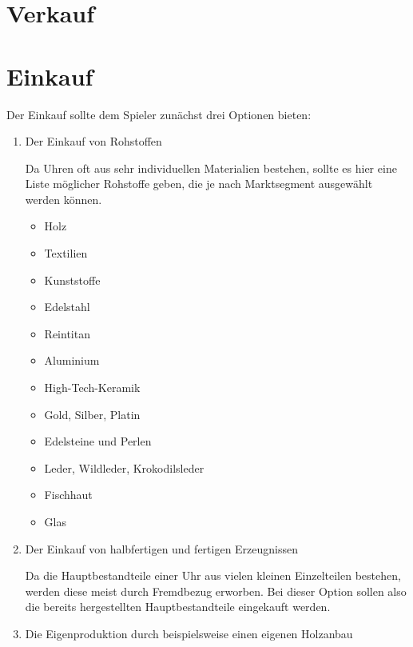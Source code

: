 \section{Verkauf}

\section{Einkauf}\label{sec:einkauf}
Der Einkauf sollte dem Spieler zunächst drei Optionen bieten:
\begin{enumerate}
\item Der Einkauf von Rohstoffen \par
Da Uhren oft aus sehr individuellen Materialien bestehen, sollte es hier eine Liste möglicher Rohstoffe geben, die je nach Marktsegment ausgewählt werden können.
\begin{itemize}
\item	Holz	\\
\item	Textilien	\\
\item	Kunststoffe	\\
\item	Edelstahl \\
\item	Reintitan \\
\item	Aluminium \\
\item	High-Tech-Keramik \\
\item	Gold, Silber, Platin
\item Edelsteine und Perlen \\
\item Leder, Wildleder, Krokodilsleder \\
\item	Fischhaut
\item	Glas \\
\end{itemize}
\item Der Einkauf von halbfertigen und fertigen Erzeugnissen \par
Da die Hauptbestandteile einer Uhr aus vielen kleinen Einzelteilen bestehen, werden diese meist durch Fremdbezug erworben. Bei dieser Option sollen also die bereits hergestellten Hauptbestandteile eingekauft werden.
\item Die Eigenproduktion durch beispielsweise einen eigenen Holzanbau
\end{enumerate}

